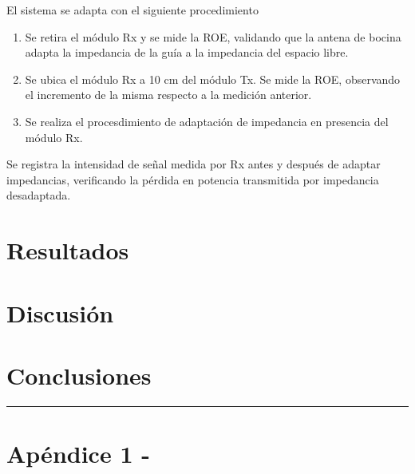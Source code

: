 \documentclass[11pt,a4paper]{article}
\begin{document}
\begin{multicols}{2}
El sistema se adapta con el siguiente procedimiento
\begin{enumerate}
    \item Se retira el módulo Rx y se mide la ROE, validando que la antena de bocina adapta la impedancia de la guía a la impedancia del espacio libre.
    \item Se ubica el módulo Rx a 10 cm del módulo Tx. Se mide la ROE, observando el incremento de la misma respecto a la medición anterior.
    \item Se realiza el procesdimiento de adaptación de impedancia en presencia del módulo Rx.
\end{enumerate}

Se registra la intensidad de señal medida por Rx antes y después de adaptar impedancias, verificando la pérdida en potencia transmitida por impedancia desadaptada.

\section{Resultados}


\section{Discusión}

\section{Conclusiones}




\end{multicols}
\newpage
\begin{appendices}
\vspace{-1em}
\hrule
\vspace{1em}
\normalsize
\section{Apéndice 1 -}
\end{appendices}

\begin{multicols}{2}

\end{multicols}
\end{document}

